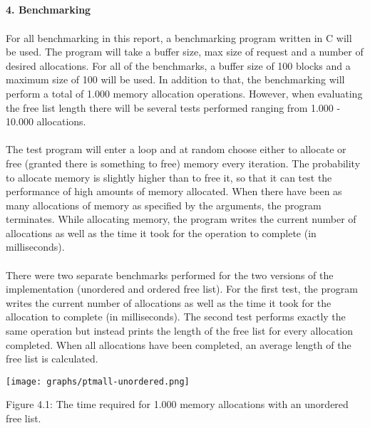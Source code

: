 \documentclass[a4paper,10pt]{article}
\begin{document}
\maketitle
\textbf
{\\\\\\\\4. Benchmarking\\\\}
For all benchmarking in this report, a benchmarking program written in C will be used. The program will take a buffer size, max size of request and a number of desired allocations. For all of the benchmarks, a buffer size of 100 blocks and a maximum size of 100 will be used. In addition to that, the benchmarking will perform a total of 1.000 memory allocation operations. However, when evaluating the free list length there will be several tests performed ranging from 1.000 - 10.000 allocations. \\\\The test program will enter a loop and at random choose either to allocate or free (granted there is something to free) memory every iteration. The probability to allocate memory is slightly higher than to free it, so that it can test the performance of high amounts of memory allocated. When there have been as many allocations of memory as specified by the arguments, the program terminates. While allocating memory, the program writes the current number of allocations as well as the time it took for the operation to complete (in milliseconds). \\\\There were two separate benchmarks performed for the two versions of the implementation (unordered and ordered free list). For the first test, the program writes the current number of allocations as well as the time it took for the allocation to complete (in milliseconds). The second test performs exactly the same operation but instead prints the length of the free list for every allocation completed. When all allocations have been completed, an average length of the free list is calculated. 

\begin{footnotesize}
\begin{center}{
\centering\texttt{[image: graphs/ptmall-unordered.png]}\par
\caption{Figure 4.1: The time required for 1.000 memory allocations with an unordered free list.}}
\end{center}
\end{footnotesize}
\end{document}
